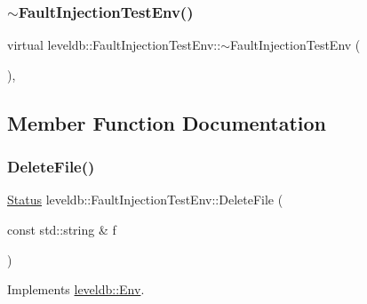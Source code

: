 \subsubsection{\texorpdfstring{$\sim$FaultInjectionTestEnv()}{~FaultInjectionTestEnv()}}
{\footnotesize\ttfamily virtual leveldb\+::\+Fault\+Injection\+Test\+Env\+::$\sim$\+Fault\+Injection\+Test\+Env (\begin{DoxyParamCaption}{ }\end{DoxyParamCaption})\hspace{0.3cm}{\ttfamily [inline]}, {\ttfamily [virtual]}}



\subsection{Member Function Documentation}
\mbox{\label{classleveldb_1_1_fault_injection_test_env_a3da37455396b1b0cd66689bf5302ebd9}} 
\subsubsection{\texorpdfstring{DeleteFile()}{DeleteFile()}}
{\footnotesize\ttfamily \mbox{\hyperlink{classleveldb_1_1_status}{Status}} leveldb\+::\+Fault\+Injection\+Test\+Env\+::\+Delete\+File (\begin{DoxyParamCaption}\item[{const std\+::string \&}]{f }\end{DoxyParamCaption})\hspace{0.3cm}{\ttfamily [virtual]}}



Implements \mbox{\hyperlink{classleveldb_1_1_env_ac956b984466d5f09309664177687f9af}{leveldb\+::\+Env}}.

